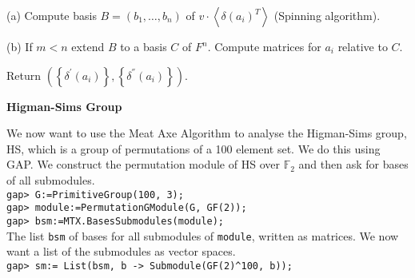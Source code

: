 \documentclass[12pt]{amsart}
\theoremstyle{definition}
\begin{document}
(a) Compute basis $B = ( b_{1}, \ldots, b_{n})$ of $v \cdot \left\langle \delta (a_{i})^{T} \right\rangle$ (Spinning algorithm).

(b)  If $m < n$ extend $B$ to a basis $C$ of $F^{n}$. Compute matrices for $a_{i}$ relative to $C$.

Return $\left( \left\{ \delta^{'} (a_{i}) \right\}, \left\{ \delta^{''} (a_{i} ) \right\} \right)$.

\begin{center}
\textbf{Higman-Sims Group}
\end{center}

We now want to use the Meat Axe Algorithm to analyse the Higman-Sims group, HS, which is a group of permutations of a 100 element set.  We do this using GAP.  We construct the permutation module of HS over $\mathbb{F}_2$ and then ask for bases of all submodules.\\
\verb"gap> G:=PrimitiveGroup(100, 3);"\\
\verb"gap> module:=PermutationGModule(G, GF(2));"\\
\verb"gap> bsm:=MTX.BasesSubmodules(module);"\\
The list \verb"bsm" of bases for all submodules of \verb"module", written as matrices.  We now want a list of the submodules as vector spaces.\\
\verb"gap> sm:= List(bsm, b -> Submodule(GF(2)^100, b));"\\
\end{document}
